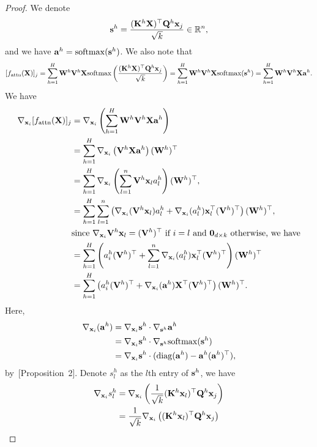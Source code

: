 \documentclass[journal]{IEEEtran}
\newcommand{\bfK}{{\bf K}}
\newcommand{\bfQ}{{\bf Q}}
\newcommand{\bfV}{{\bf V}}
\newcommand{\bfW}{{\bf W}}
\newcommand{\bfX}{{\bf X}}
\newcommand{\bfa}{{\bf a}}
\newcommand{\bfs}{{\bf s}}
\newcommand{\bfx}{{\bf x}}
\theoremstyle{plain}
\theoremstyle{definition}
\theoremstyle{remark}
\begin{document}
\begin{proof}
    We denote 
    $$
    \bfs^h =  \frac{(\bfK^h \bfX)^\top \bfQ^h \bfx_j}{\sqrt{k}} \in \mathbb{R}^{n},
    $$
    and we have $\bfa^h = {\rm softmax}(\bfs^h)$. We also note that 
    $$
    [f_{\rm attn}(\bfX)]_j = \sum_{h=1}^H \bfW^h \bfV^h \bfX {\rm softmax} \left( \frac{(\bfK^h \bfX)^\top \bfQ^h \bfx_j}{\sqrt{k}} \right) = \sum_{h=1}^H \bfW^h \bfV^h \bfX {\rm softmax} (\bfs^h) = \sum_{h=1}^H \bfW^h \bfV^h \bfX \bfa^h.
    $$
    We have 
    \begin{align}
        \nabla_{\bfx_i} [f_{\rm attn}(\bfX)]_j &= \nabla_{\bfx_i} \left( \sum_{h=1}^H \bfW^h \bfV^h \bfX \bfa^h \right) \\
        &=  \sum_{h=1}^H \nabla_{\bfx_i} \left(   \bfV^h \bfX \bfa^h \right) (\bfW^h)^\top \\
        &=  \sum_{h=1}^H \nabla_{\bfx_i} \left( \sum_{l=1}^n  \bfV^h \bfx_l a^h_l \right) (\bfW^h)^\top, \\
        &= \sum_{h=1}^H   \sum_{l=1}^n \left( \nabla_{\bfx_i} (\bfV^h \bfx_l) a^h_l +  \nabla_{\bfx_i}(a^h_l) \bfx_l^\top (\bfV^h )^\top \right) (\bfW^h)^\top, \\
        & \text{since $\nabla_{\bfx_i} \bfV^h \bfx_l = (\bfV^h)^\top$ if $i=l$ and ${\bf 0}_{d \times k}$ otherwise, we have} \\
        &= \sum_{h=1}^H  \left(  a^h_i (\bfV^h)^\top + \sum_{l=1}^n \nabla_{\bfx_i}(a^h_l) \bfx_l^\top (\bfV^h )^\top \right) (\bfW^h)^\top \\
        &= \sum_{h=1}^H  \left(  a^h_i (\bfV^h)^\top + \nabla_{\bfx_i}(\bfa^h) \bfX^\top (\bfV^h )^\top \right) (\bfW^h)^\top.\label{eq:grad_attn_interm1}
    \end{align}
    Here, 
    \begin{align}
    \nabla_{\bfx_i}(\bfa^h) &= \nabla_{\bfx_i} \bfs^h \cdot \nabla_{\bfs^h} \bfa^h \\
    &= \nabla_{\bfx_i} \bfs^h \cdot \nabla_{\bfs^h} {\rm softmax} (\bfs^h) \\
    &= \nabla_{\bfx_i} \bfs^h \cdot ({\rm diag}(\bfa^h) - \bfa^h (\bfa^h)^\top) \label{eq:grad_attn_interm2},
    \end{align}
by~\cite{gao2017properties}[Proposition~2]. Denote $s^h_l$ as the $l$th entry of $\bfs^h$, we have
\begin{align}
    \nabla_{\bfx_i} s^h_l &= \nabla_{\bfx_i} \left( \frac{1}{\sqrt{k}} (\bfK^h \bfx_l)^\top \bfQ^h \bfx_j \right) \\
    &= \frac{1}{\sqrt{k}} \nabla_{\bfx_i} \left(  (\bfK^h \bfx_l)^\top \bfQ^h \bfx_j \right) \\

\end{align}
\end{proof}
\end{document}
